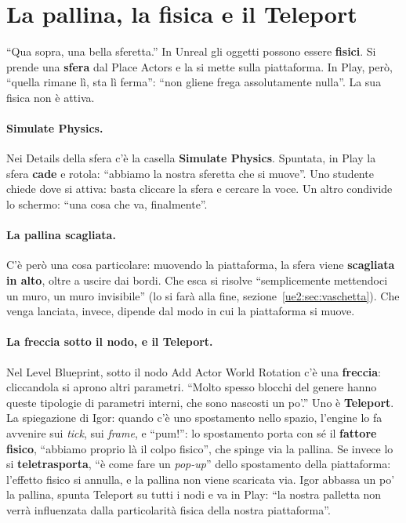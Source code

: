 \section{La pallina, la fisica e il Teleport}
\label{ue2:sec:fisica}

``Qua sopra, una bella sferetta.'' In Unreal gli oggetti possono essere
\textbf{fisici}. Si prende una \textbf{sfera} dal Place Actors e la si mette sulla
piattaforma. In Play, però, ``quella rimane lì, sta lì ferma'': ``non gliene frega
assolutamente nulla''. La sua fisica non è attiva.

\paragraph{Simulate Physics.} Nei Details della sfera c'è la casella \textbf{Simulate
Physics}. Spuntata, in Play la sfera \textbf{cade} e rotola: ``abbiamo la nostra sferetta
che si muove''. Uno studente chiede dove si attiva: basta cliccare la sfera e cercare la
voce. Un altro condivide lo schermo: ``una cosa che va, finalmente''.

\paragraph{La pallina scagliata.} C'è però una cosa particolare: muovendo la
piattaforma, la sfera viene \textbf{scagliata in alto}, oltre a uscire dai bordi. Che
esca si risolve ``semplicemente mettendoci un muro, un muro invisibile'' (lo si farà alla
fine, sezione~\ref{ue2:sec:vaschetta}). Che venga lanciata, invece, dipende dal modo in
cui la piattaforma si muove.

\paragraph{La freccia sotto il nodo, e il Teleport.} Nel Level Blueprint, sotto il nodo
Add Actor World Rotation c'è una \textbf{freccia}: cliccandola si aprono altri parametri.
``Molto spesso blocchi del genere hanno queste tipologie di parametri interni, che sono
nascosti un po'.'' Uno è \textbf{Teleport}. La spiegazione di Igor: quando c'è uno
spostamento nello spazio, l'engine lo fa avvenire sui \emph{tick}, sui \emph{frame}, e
``pum!'': lo spostamento porta con sé il \textbf{fattore fisico}, ``abbiamo proprio là il
colpo fisico'', che spinge via la pallina. Se invece lo si \textbf{teletrasporta}, ``è
come fare un \emph{pop-up}'' dello spostamento della piattaforma: l'effetto fisico si
annulla, e la pallina non viene scaricata via. Igor abbassa un po' la pallina, spunta
Teleport su tutti i nodi e va in Play: ``la nostra palletta non verrà influenzata dalla
particolarità fisica della nostra piattaforma''.

